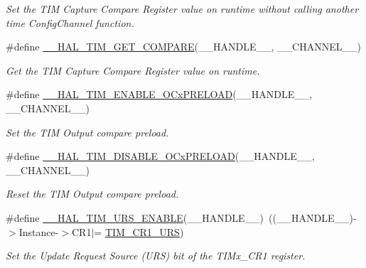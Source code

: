 \begin{DoxyCompactItemize}
\begin{DoxyCompactList}\small\item\em Set the T\+IM Capture Compare Register value on runtime without calling another time Config\+Channel function. \end{DoxyCompactList}\item 
\#define \mbox{\hyperlink{group___t_i_m___exported___macros_gaa40722f56910966e1da5241b610eed84}{\+\_\+\+\_\+\+H\+A\+L\+\_\+\+T\+I\+M\+\_\+\+G\+E\+T\+\_\+\+C\+O\+M\+P\+A\+RE}}(\+\_\+\+\_\+\+H\+A\+N\+D\+L\+E\+\_\+\+\_\+,  \+\_\+\+\_\+\+C\+H\+A\+N\+N\+E\+L\+\_\+\+\_\+)
\begin{DoxyCompactList}\small\item\em Get the T\+IM Capture Compare Register value on runtime. \end{DoxyCompactList}\item 
\#define \mbox{\hyperlink{group___t_i_m___exported___macros_ga199e848f0a301987a500faea0db2dd70}{\+\_\+\+\_\+\+H\+A\+L\+\_\+\+T\+I\+M\+\_\+\+E\+N\+A\+B\+L\+E\+\_\+\+O\+Cx\+P\+R\+E\+L\+O\+AD}}(\+\_\+\+\_\+\+H\+A\+N\+D\+L\+E\+\_\+\+\_\+,  \+\_\+\+\_\+\+C\+H\+A\+N\+N\+E\+L\+\_\+\+\_\+)
\begin{DoxyCompactList}\small\item\em Set the T\+IM Output compare preload. \end{DoxyCompactList}\item 
\#define \mbox{\hyperlink{group___t_i_m___exported___macros_ga3e0ec4eb797b54c408a3be067f41a2f8}{\+\_\+\+\_\+\+H\+A\+L\+\_\+\+T\+I\+M\+\_\+\+D\+I\+S\+A\+B\+L\+E\+\_\+\+O\+Cx\+P\+R\+E\+L\+O\+AD}}(\+\_\+\+\_\+\+H\+A\+N\+D\+L\+E\+\_\+\+\_\+,  \+\_\+\+\_\+\+C\+H\+A\+N\+N\+E\+L\+\_\+\+\_\+)
\begin{DoxyCompactList}\small\item\em Reset the T\+IM Output compare preload. \end{DoxyCompactList}\item 
\#define \mbox{\hyperlink{group___t_i_m___exported___macros_ga3b06856bd6d7e10cfff342b1726db51d}{\+\_\+\+\_\+\+H\+A\+L\+\_\+\+T\+I\+M\+\_\+\+U\+R\+S\+\_\+\+E\+N\+A\+B\+LE}}(\+\_\+\+\_\+\+H\+A\+N\+D\+L\+E\+\_\+\+\_\+)~((\+\_\+\+\_\+\+H\+A\+N\+D\+L\+E\+\_\+\+\_\+)-\/$>$Instance-\/$>$C\+R1$\vert$= \mbox{\hyperlink{group___peripheral___registers___bits___definition_ga06c997c2c23e8bef7ca07579762c113b}{T\+I\+M\+\_\+\+C\+R1\+\_\+\+U\+RS}})
\begin{DoxyCompactList}\small\item\em Set the Update Request Source (U\+RS) bit of the T\+I\+Mx\+\_\+\+C\+R1 register. \end{DoxyCompactList}\item 

\end{DoxyCompactItemize}
